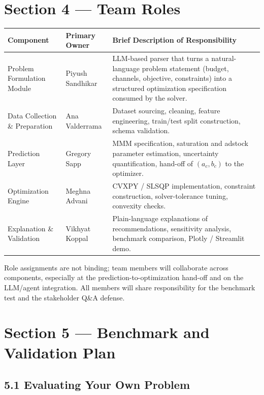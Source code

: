 \documentclass[11pt]{article}
\begin{document}
\section{Section 4 --- Team Roles}

\begin{center}
\small
\begin{tabular}{p{4.2cm}p{3.2cm}p{8cm}}
\toprule
\textbf{Component} & \textbf{Primary Owner} & \textbf{Brief Description of Responsibility} \\
\midrule
Problem Formulation Module     & Piyush Sandhikar  & LLM-based parser that turns a natural-language problem statement (budget, channels, objective, constraints) into a structured optimization specification consumed by the solver. \\
Data Collection \& Preparation & Ana Valderrama    & Dataset sourcing, cleaning, feature engineering, train/test split construction, schema validation. \\
Prediction Layer               & Gregory Sapp      & MMM specification, saturation and adstock parameter estimation, uncertainty quantification, hand-off of $(a_c, b_c)$ to the optimizer. \\
Optimization Engine            & Meghna Advani     & CVXPY / SLSQP implementation, constraint construction, solver-tolerance tuning, convexity checks. \\
Explanation \& Validation      & Vikhyat Koppal    & Plain-language explanations of recommendations, sensitivity analysis, benchmark comparison, Plotly / Streamlit demo. \\
\bottomrule
\end{tabular}
\end{center}

Role assignments are not binding; team members will collaborate across components, especially at the prediction-to-optimization hand-off and on the LLM/agent integration. All members will share responsibility for the benchmark test and the stakeholder Q\&A defense.

\section{Section 5 --- Benchmark and Validation Plan}

\subsection*{5.1 \; Evaluating Your Own Problem}
\end{document}
